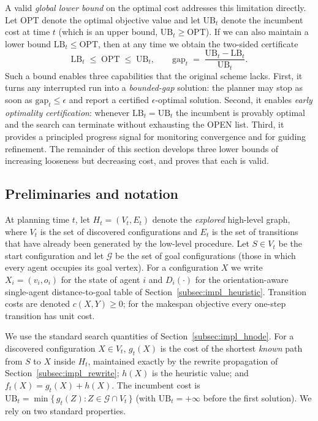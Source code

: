 \documentclass[lettersize,journal]{IEEEtran}
\begin{document}
A valid \emph{global lower bound} on the optimal cost addresses this limitation directly. Let $\mathrm{OPT}$ denote the optimal objective value and let $\mathrm{UB}_t$ denote the incumbent cost at time $t$ (which is an upper bound, $\mathrm{UB}_t\ge \mathrm{OPT}$). If we can also maintain a lower bound $\mathrm{LB}_t\le \mathrm{OPT}$, then at any time we obtain the two-sided certificate
\[
\mathrm{LB}_t \;\le\; \mathrm{OPT} \;\le\; \mathrm{UB}_t,
\qquad
\mathrm{gap}_t \;=\; \frac{\mathrm{UB}_t-\mathrm{LB}_t}{\mathrm{UB}_t}.
\]
Such a bound enables three capabilities that the original scheme lacks. First, it turns any interrupted run into a \emph{bounded-gap} solution: the planner may stop as soon as $\mathrm{gap}_t\le\epsilon$ and report a certified $\epsilon$-optimal solution. Second, it enables \emph{early optimality certification}: whenever $\mathrm{LB}_t=\mathrm{UB}_t$ the incumbent is provably optimal and the search can terminate without exhausting the OPEN list. Third, it provides a principled progress signal for monitoring convergence and for guiding refinement. The remainder of this section develops three lower bounds of increasing looseness but decreasing cost, and proves that each is valid.

\subsection{Preliminaries and notation}
\label{subsec:lb_prelim}

At planning time $t$, let $H_t=(V_t,E_t)$ denote the \emph{explored} high-level graph, where $V_t$ is the set of discovered configurations and $E_t$ is the set of transitions that have already been generated by the low-level procedure. Let $S\in V_t$ be the start configuration and let $\mathcal{G}$ be the set of goal configurations (those in which every agent occupies its goal vertex). For a configuration $X$ we write $X_i=(v_i,o_i)$ for the state of agent $i$ and $D_i(\cdot)$ for the orientation-aware single-agent distance-to-goal table of Section~\ref{subsec:impl_heuristic}. Transition costs are denoted $c(X,Y)\ge 0$; for the makespan objective every one-step transition has unit cost.

We use the standard search quantities of Section~\ref{subsec:impl_hnode}. For a discovered configuration $X\in V_t$, $g_t(X)$ is the cost of the shortest \emph{known} path from $S$ to $X$ inside $H_t$, maintained exactly by the rewrite propagation of Section~\ref{subsec:impl_rewrite}; $h(X)$ is the heuristic value; and $f_t(X)=g_t(X)+h(X)$. The incumbent cost is $\mathrm{UB}_t=\min\{\,g_t(Z):Z\in \mathcal{G}\cap V_t\,\}$ (with $\mathrm{UB}_t=+\infty$ before the first solution). We rely on two standard properties.
\end{document}
